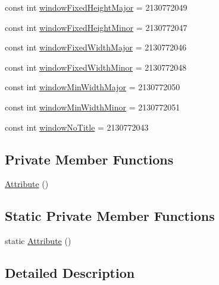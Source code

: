 \begin{DoxyCompactItemize}
\item 
const int \mbox{\hyperlink{class_f_w_p_s___app_1_1_droid_1_1_resource_1_1_attribute_aee048bbdb35fbc80bf610176742c49c6}{window\+Fixed\+Height\+Major}} = 2130772049
\item 
const int \mbox{\hyperlink{class_f_w_p_s___app_1_1_droid_1_1_resource_1_1_attribute_a37fea5e7d606e08676b0a53f719a7f38}{window\+Fixed\+Height\+Minor}} = 2130772047
\item 
const int \mbox{\hyperlink{class_f_w_p_s___app_1_1_droid_1_1_resource_1_1_attribute_a9b77d490752460846f59f3fa94faeaeb}{window\+Fixed\+Width\+Major}} = 2130772046
\item 
const int \mbox{\hyperlink{class_f_w_p_s___app_1_1_droid_1_1_resource_1_1_attribute_a511ff732ebc1ab43874ee857623d6493}{window\+Fixed\+Width\+Minor}} = 2130772048
\item 
const int \mbox{\hyperlink{class_f_w_p_s___app_1_1_droid_1_1_resource_1_1_attribute_acd1bb69bad54bf210cf896290ee1a902}{window\+Min\+Width\+Major}} = 2130772050
\item 
const int \mbox{\hyperlink{class_f_w_p_s___app_1_1_droid_1_1_resource_1_1_attribute_aa9d594339c216d2f76faab4d09005423}{window\+Min\+Width\+Minor}} = 2130772051
\item 
const int \mbox{\hyperlink{class_f_w_p_s___app_1_1_droid_1_1_resource_1_1_attribute_ad8bf4398afb1ab1737761b912f5a6029}{window\+No\+Title}} = 2130772043
\end{DoxyCompactItemize}
\subsection*{Private Member Functions}
\begin{DoxyCompactItemize}
\item 
\mbox{\hyperlink{class_f_w_p_s___app_1_1_droid_1_1_resource_1_1_attribute_aab1b6c669c2333fb2ca18e109d1f7874}{Attribute}} ()
\end{DoxyCompactItemize}
\subsection*{Static Private Member Functions}
\begin{DoxyCompactItemize}
\item 
static \mbox{\hyperlink{class_f_w_p_s___app_1_1_droid_1_1_resource_1_1_attribute_adc34864fb5f0a37d83b0d099e225ec33}{Attribute}} ()
\end{DoxyCompactItemize}


\subsection{Detailed Description}


